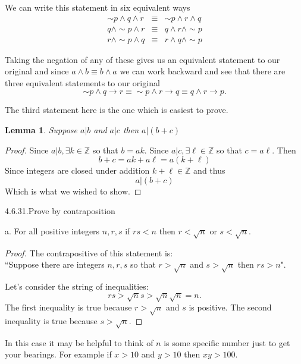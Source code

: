 \documentclass[16 pt]{amsart}
\newtheorem{lem}[thm]{Lemma}
\theoremstyle{definition}
\theoremstyle{remark}
\numberwithin{equation}{subsection}
\newcommand{\Z}{\mathbb{Z}}
\begin{document}
We can write this statement in six equivalent ways
\begin{eqnarray*}
\sim p \wedge q \wedge r & \equiv & \sim p \wedge r \wedge q \\
q \wedge \sim p \wedge r & \equiv & q \wedge r \wedge \sim p \\
r \wedge \sim p \wedge q & \equiv & r \wedge q \wedge \sim p 
\end{eqnarray*}

Taking the negation of any of these gives us an equivalent statement to our original and since $ a\wedge b \equiv b\wedge a$ we can work backward and see that there are three equivalent statements to our original
\[
\sim p \wedge q \rightarrow r \equiv \sim p \wedge r \rightarrow q \equiv q\wedge r \rightarrow p.
\]

The third statement here is the one which is easiest to prove.
\begin{lem}Suppose $a|b$ and $a|c$ then $a|(b+c)$
\end{lem}
\begin{proof}
Since $a|b, \exists k\in\Z$ so that $b=ak$.  Since $a|c, \exists \ell\in\Z$ so that $c= a\ell$.  Then
\[
b+c = ak + a\ell = a(k+\ell)
\]
Since integers are closed under addition $k+\ell\in\Z$ and thus
\[
a|(b+c)
\]
Which is what we wished to show.
\end{proof}


\newpage

4.6.31.Prove by contraposition

a. For all positive integers $n,r,s$  if $rs< n$ then $r<\sqrt{n}$ or $s<\sqrt{n}$.

\vspace{.5in}

\begin{proof}
The contrapositive of this statement is:\\

``Suppose there are integers $n,r,s$ so that $r>\sqrt{n}$ and $s>\sqrt{n}$ then $rs>n$".

Let's consider the string of inequalities:
\[
rs > \sqrt{n} s > \sqrt{n}\sqrt{n}  = n.
\]
The first inequality is true because $r>\sqrt{n}$ and $s$ is positive.  The second inequality is true because $s>\sqrt{n}$.

\end{proof}


In this case it may be helpful to think of $n$ is some specific number just to get your bearings.  For example if $x>10$ and $y>10$ then $xy>100$.
\end{document}
